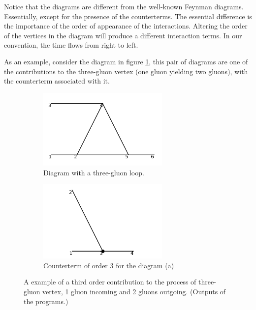 \documentclass[11pt,a4paper,twoside,pdf]{article}
\numberwithin{equation}{section}
\begin{document}
Notice that the diagrams are different from the well-known Feynman diagrams\cite{Peskin:1995ev}.
Essentially, except for the presence
of the counterterms. The essential difference is the importance of the order of appearance
of the interactions. Altering
the order of the vertices in the diagram will produce a different interaction terms. 
In our convention, the time flows from right to left.

As an example, consider the diagram in figure \ref{fig:example_diagram}, this pair of 
diagrams are one of the contributions to the three-gluon vertex (one gluon yielding two gluons), 
with the counterterm associated with it. 

\begin{figure}[h!]
    \centering
    \begin{subfigure}[t]{0.5\textwidth}
        \centering
        \includegraphics[width=0.7\textwidth]{plots/order3/order3_1to2/1.png}
        \caption{Diagram with a three-gluon loop.}
    \end{subfigure}%
    \begin{subfigure}[t]{0.5\textwidth}
        \centering
        \includegraphics[width=0.7\textwidth]{plots/order3/order3_1to2/counterterms/1.png}
        \caption{Counterterm of order 3 for the diagram (a)}
    \end{subfigure}
    \caption{A example of a third order contribution to the 
    process of three-gluon vertex, 1 gluon incoming and 2 gluons outgoing. (Outputs of 
    the programs.)}
    \label{fig:example_diagram}
\end{figure}
\end{document}
